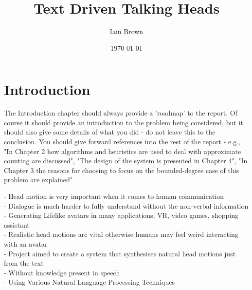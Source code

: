 \documentclass[bsc,frontabs,twoside,singlespacing,parskip]{infthesis}
\begin{document}
\title{Text Driven Talking Heads}

\author{Iain Brown}

\date{\today}
\maketitle
\tableofcontents

\chapter{Introduction}

The Introduction chapter should always provide a 'roadmap' to the report. Of course it should provide an introduction to the problem being considered, but it should also give some details of what you did - do not leave this to the conclusion. You should give forward references into the rest of the report - e.g., "In Chapter 2 how algorithms and heuristics are used to deal with approximate counting are discussed", "The design of the system is presented in Chapter 4", "In Chapter 3 the reasons for choosing to focus on the bounded-degree case of this problem are explained"


- Head motion is very important when it comes to human communication \\
- Dialogue is much harder to fully understand without the non-verbal information \\
- Generating Lifelike avatars in many applications, VR, video games, shopping assistant \\
- Realistic head motions are vital otherwise humans may feel weird interacting with an avatar \\
- Project aimed to create a system that synthesises natural head motions just from the text \\
- Without knowledge present in speech \\
- Using Various Natural Language Processing Techniques \\
\end{document}
